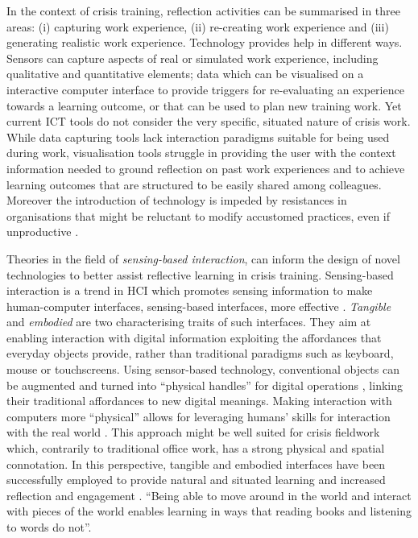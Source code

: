 In the context of crisis training, reflection activities can be summarised in three areas: (i) capturing work experience, (ii) re-creating work experience and (iii) generating realistic work experience. Technology provides help in different ways. Sensors can capture aspects of real or simulated work experience, including qualitative and quantitative elements; data which can be visualised on a interactive computer interface to provide triggers for re-evaluating an experience towards a learning outcome, or that can be used to plan new training work. Yet current ICT tools do not consider the very specific, situated nature of crisis work. While data capturing tools lack interaction paradigms suitable for being used during work, visualisation tools struggle in providing the user with the context information needed to ground reflection on past work experiences and to achieve learning outcomes that are structured to be easily shared among colleagues. Moreover the introduction of technology is impeded by resistances in organisations that might be reluctant to modify accustomed practices, even if unproductive \autocite{JCCM:JCCM15}.

Theories in the field of \emph{sensing-based interaction}, can inform the design of novel technologies to better assist reflective learning in crisis training. Sensing-based interaction is a trend in HCI which promotes sensing information to make human-computer interfaces, sensing-based interfaces, more effective \autocite{Zhai:2005jm}. \emph{Tangible} and \emph{embodied} \autocite{Dourish:2001vc} are two characterising traits of such interfaces. They aim at enabling interaction with digital information exploiting the affordances that everyday objects provide, rather than traditional paradigms such as keyboard, mouse or touchscreens. Using sensor-based technology, conventional objects can be augmented and turned into ``physical handles'' for digital operations \autocite{Ishii:1997ur}, linking their traditional affordances to new digital meanings. Making interaction with computers more ``physical'' allows for leveraging humans' skills for interaction with the real world \autocite{Shaer:2009fx}. This approach might be well suited for crisis fieldwork which, contrarily to traditional office work, has a strong physical and spatial connotation. In this perspective, tangible and embodied interfaces have been successfully employed to provide natural \autocite{Terrenghi:2005gq} and situated \autocite{Klemmer:2006ez} learning and increased reflection and engagement \autocite{Rogers:2006te}. ``Being able to move around in the world and interact with pieces of the world enables learning in ways that reading books and listening to words do not''. \autocite{Klemmer:2006ez}

